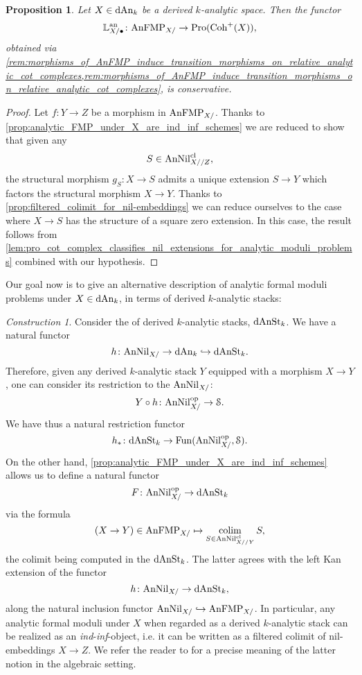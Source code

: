 \documentclass[10pt,a4paper,reqno]{amsart} %
\theoremstyle{plain}
\newtheorem{prop}[thm]{Proposition}
\theoremstyle{definition}
\theoremstyle{remark}
\numberwithin{equation}{section}
\newtheorem{construction}[thm]{Construction}
\begin{document}
\begin{prop} \label{prop:conservativity_of_relative_an_cot_complex}
    Let $X \in \mathrm{dAn}_k$ be a derived $k$-analytic space. Then the functor
    \[
        \mathbb L^\mathrm{an}_{X/ \bullet} \colon \mathrm{AnFMP}_{X/} \to \mathrm{Pro}(\mathrm{Coh}^+(X)),
    \]
    obtained via \cref{rem:morphisms_of_AnFMP_induce_transition_morphisms_on_relative_analytic_cot_complexes,rem:morphisms_of_AnFMP_induce_transition_morphisms_on_relative_analytic_cot_complexes},
    is conservative.
\end{prop}

\begin{proof} Let $f \colon Y \to Z $ be a morphism in $\mathrm{AnFMP}_{X/}$.
    Thanks to \cref{prop:analytic_FMP_under_X_are_ind_inf_schemes} we are reduced to show that given any
        \[
            S \in \mathrm{AnNil}_{X//Z}^{\mathrm{cl}},  
        \]
    the structural morphism $g_S \colon X \to S$ admits a unique extension $S \to Y$ which factors the structural morphism $X \to Y$. Thanks to
    \cref{prop:filtered_colimit_for_nil-embeddings} we can reduce ourselves to the case where $X \to S$ has the structure of
    a square zero extension. In this case, the result follows from \cref{lem:pro_cot_complex_classifies_nil_extensions_for_analytic_moduli_problems}
    combined with our hypothesis.
\end{proof}

Our goal now is to give an alternative description of analytic formal moduli problems under $X \in \mathrm{dAn}_k$, in terms of derived $k$-analytic stacks: 

\begin{construction} \label{const:anFMP_as_ind_inf_schemes} Consider the \infcat of derived $k$-analytic stacks, $\mathrm{dAnSt}_k$.
    We have a natural functor
        \[
            h \colon \mathrm{AnNil}_{X/} \to \mathrm{dAn}_k \hookrightarrow \mathrm{dAnSt}_k.
        \]
    Therefore, given any derived $k$-analytic stack $Y$ equipped with a morphism $X \to Y$, one can consider its restriction to the \infcat
    $\mathrm{AnNil}_{X/}$:
        \[
            Y \circ h \colon \mathrm{AnNil}_{X/} ^\mathrm{op} \to \mathcal S.      
        \]
    We have thus a natural restriction functor
        \[
            h_* \colon \mathrm{dAnSt}_k \to \operatorname{Fun}(\mathrm{AnNil}_{X/} ^\mathrm{op}, \mathcal S).  
        \]
On the other hand, \cref{prop:analytic_FMP_under_X_are_ind_inf_schemes} allows us to define a natural functor
    \[
        F \colon \mathrm{AnNil}_{X/} ^\mathrm{op} \to \mathrm{dAnSt}_k
    \]
via the formula
    \[
        (X \to Y) \in \mathrm{AnFMP}_{X/ } \mapsto \operatorname*{colim}_{S \in \mathrm{AnNil}_{X/ /Y}^{\mathrm{cl}}} S,  
    \]
the colimit being computed in the \infcat $\mathrm{dAnSt}_k$. The latter agrees with the left Kan extension of the functor 
    \[
        h \colon \mathrm{AnNil}_{X/ } \to \mathrm{dAnSt}_k,  
    \]
along the natural inclusion functor $\mathrm{AnNil}_{X/ } \hookrightarrow \mathrm{AnFMP}_{X/ }$.
In particular, any analytic formal moduli under $X$ when regarded as a derived $k$-analytic stack can be realized
as an \emph{ind}-\emph{inf}-object, i.e. it can be written as a filtered colimit of nil-embeddings $X \to Z$.
We refer the reader to \cite[\S1]{Gaitsgory_Study_II} for a precise meaning
of the latter notion in the algebraic setting.
\end{construction}
\end{document}
